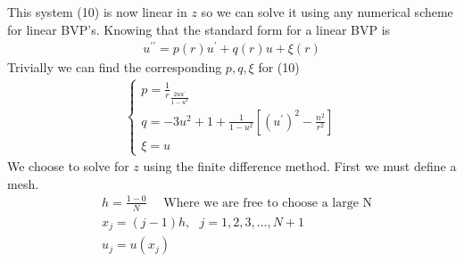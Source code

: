 \documentclass{article}
\begin{document}
\begin{enumerate}
This system (10) is now linear in $z$ so we can solve it using any numerical scheme for linear BVP's. Knowing that the standard form for a linear BVP is
\begin{align}
u^{\prime\prime} = p(r)u^\prime + q(r)u + \xi (r)
\end{align}
Trivially we can find the corresponding $p,q,\xi$ for (10)
\begin{align*}
\begin{cases}
p = \frac{1}{r} _ \frac{2uu^\prime}{1-u^2} \\
q = -3u^2 + 1 + \frac{1}{1-u^2}\left[(u^\prime)^2 -\frac{n^2}{r^2} \right] \\
\xi = u
\end{cases}
\end{align*}
We choose to solve for $z$ using the finite difference method. First we must define a mesh.
\begin{align}
&h = \frac{1-0}{N} \ \ \ \ \ \ \text{Where we are free to choose a large N} \\
&x_j = (j-1)h, \ \ \ j = 1,2,3,...,N+1 \\
&u_j = u(x_j)
\end{align}
 

\end{enumerate}
\end{document}
